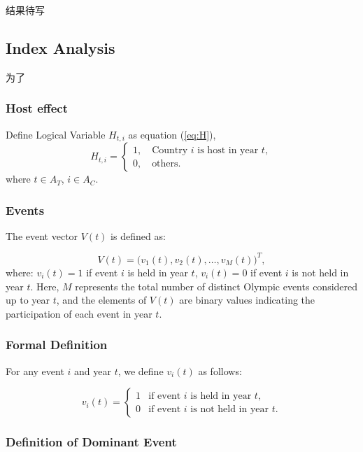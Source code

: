 \documentclass{mcmthesis}
\begin{document}
结果待写



\subsection{Index Analysis}
为了
\subsubsection{Host effect}

Define Logical Variable $H_{t,i}$ as equation (\ref{eq:H}),
\begin{equation}
	H_{t,i}=
	\begin{cases}
		1, \quad \text{Country } i \text{ is host in year } t, \\
		0, \quad \text{others}.
	\end{cases}
	\label{eq:H}
\end{equation}
where $t\in A_{T}$, $i\in A_{C}$.



\subsubsection{Events}
The event vector \( V(t) \) is defined as:

\[
V(t) = \big( v_1(t), v_2(t), \dots, v_M(t) \big)^T,
\]
where: \( v_i(t) = 1 \) if event \( i \) is held in year \( t \),
\( v_i(t) = 0 \) if event \( i \) is not held in year \( t \). Here, \( M \) represents the total number of distinct Olympic events considered up to year \( t \), and the elements of \( V(t) \) are binary values indicating the participation of each event in year \( t \).

\subsubsection{Formal Definition}

For any event \( i \) and year \( t \), we define \( v_i(t) \) as follows:

\[
v_i(t) =
\begin{cases}
	1 & \text{if event } i \text{ is held in year } t, \\
	0 & \text{if event } i \text{ is not held in year } t.
\end{cases}
\]


\subsubsection{Definition of Dominant Event}
\end{document}
